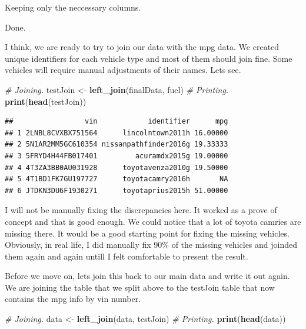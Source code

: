 \documentclass[]{book}
\newenvironment{Shaded}{\begin{snugshade}}{\end{snugshade}}
\newcommand{\CommentTok}[1]{\textcolor[rgb]{0.56,0.35,0.01}{\textit{#1}}}
\newcommand{\KeywordTok}[1]{\textcolor[rgb]{0.13,0.29,0.53}{\textbf{#1}}}
\newcommand{\NormalTok}[1]{#1}
\newcommand{\OperatorTok}[1]{\textcolor[rgb]{0.81,0.36,0.00}{\textbf{#1}}}
\newcommand{\StringTok}[1]{\textcolor[rgb]{0.31,0.60,0.02}{#1}}
\begin{document}
Keeping only the neccessary columns.

\begin{Shaded}
\end{Shaded}

Done.

I think, we are ready to try to join our data with the mpg data. We created unique identifiers for each vehicle type and most of them should join fine. Some vehicles will require manual adjustments of their names. Lets see.

\begin{Shaded}
\begin{Highlighting}[]
\CommentTok{# Joining.}
\NormalTok{testJoin <-}\StringTok{ }\KeywordTok{left_join}\NormalTok{(finalData, fuel)}
\CommentTok{# Printing.}
\KeywordTok{print}\NormalTok{(}\KeywordTok{head}\NormalTok{(testJoin))}
\end{Highlighting}
\end{Shaded}

\begin{verbatim}
##                 vin            identifier      mpg
## 1 2LNBL8CVXBX751564      lincolntown2011h 16.00000
## 2 5N1AR2MM5GC610354 nissanpathfinder2016g 19.33333
## 3 5FRYD4H44FB017401         acuramdx2015g 19.00000
## 4 4T3ZA3BB0AU031928      toyotavenza2010g 19.50000
## 5 4T1BD1FK7GU197727      toyotacamry2016h       NA
## 6 JTDKN3DU6F1930271      toyotaprius2015h 51.00000
\end{verbatim}

I will not be manually fixing the discrepancies here. It worked as a prove of concept and that is good enough. We could notice that a lot of toyota camries are missing there. It would be a good starting point for fixing the missing vehicles. Obviously, in real life, I did manually fix 90\% of the missing vehicles and joinded them again and again untill I felt comfortable to present the result.

Before we move on, lets join this back to our main data and write it out again. We are joining the table that we split above to the testJoin table that now contains the mpg info by vin number.

\begin{Shaded}
\begin{Highlighting}[]
\CommentTok{# Joining.}
\NormalTok{data <-}\StringTok{ }\KeywordTok{left_join}\NormalTok{(data, testJoin)}
\CommentTok{# Printing.}
\KeywordTok{print}\NormalTok{(}\KeywordTok{head}\NormalTok{(data))}
\end{Highlighting}
\end{Shaded}
\end{document}
